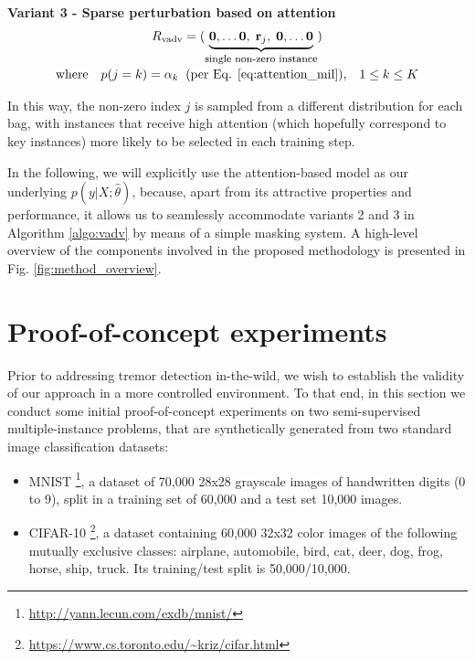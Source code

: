 \documentclass[journal,twoside,web]{ieeecolor}
\begin{document}
\begin{center}
  \textbf{Variant 3 - Sparse perturbation based on attention}
	\begin{gather*}
		R\textsubscript{vadv} = \left(\smash[b]{\underbrace{\mathbf{0}, \dots \mathbf{0}, \;\mathbf{r}_j, \;\mathbf{0}, \dots \mathbf{0}}_{\text{\footnotesize single non-zero instance}}} \right) \\\\
		\text{where} \quad p(j=k) = \alpha_k \;\; (\text{per
                  Eq. \ref{eq:attention_mil})}, \;\;\; 1 \leq k \leq K
	\end{gather*}
\end{center}

In this way, the non-zero index $j$ is sampled
from a different distribution for each bag, with instances that
receive high attention (which hopefully
correspond to key instances) more likely to be selected
in each training step.

In the following, we will explicitly use the attention-based model as our underlying
$p(y|X; \hat{\theta})$, because, apart from its attractive properties and performance, it allows
us to seamlessly accommodate variants 2 and 3 in Algorithm \ref{algo:vadv} by
means of a simple masking system. 
A high-level overview of the components involved in the proposed
methodology is presented in Fig. \ref{fig:method_overview}.


\section{Proof-of-concept experiments}
\label{sec:experiments}
Prior to addressing tremor detection in-the-wild, we wish to establish the
validity of our approach in a more controlled environment. To that end, in this
section we conduct some initial proof-of-concept experiments on two
semi-supervised  multiple-instance problems, that are synthetically generated
from two standard image classification datasets:
\begin{itemize}
  \item MNIST \footnote{\url{http://yann.lecun.com/exdb/mnist/}}, a 
    dataset of 70,000 28x28 grayscale images of handwritten digits (0
    to 9), split in a training set of 60,000 and a test set 10,000 images.

  \item CIFAR-10 \footnote{\url{https://www.cs.toronto.edu/~kriz/cifar.html}}, a
    dataset containing 60,000 32x32 color images of the following
    mutually exclusive classes: airplane, automobile, bird, cat, deer, dog,
    frog, horse, ship, truck. Its training/test split is 50,000/10,000.

\end{itemize}
\end{document}
